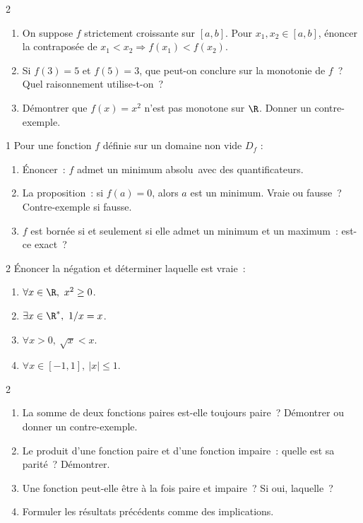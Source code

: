\begin{exo}{2}
\begin{enumerate}
  \item On suppose $f$ strictement croissante sur $[a,b]$.
        Pour $x_1,x_2\in[a,b]$, \'enoncer la contrapos\'ee de
        $x_1<x_2\Rightarrow f(x_1)<f(x_2)$.
  \item Si $f(3)=5$ et $f(5)=3$, que peut-on conclure sur la monotonie de $f$~?
        Quel raisonnement utilise-t-on~?
  \item D\'emontrer que $f(x)=x^2$ n'est pas monotone sur $\R$.
        Donner un contre-exemple.
\end{enumerate}
\end{exo}

\begin{exo}{1}
Pour une fonction $f$ d\'efinie sur un domaine non vide $D_f$ :
\begin{enumerate}
  \item \'Enoncer~: \og $f$ admet un minimum absolu\fg\ avec des quantificateurs.
  \item La proposition~: \og si $f(a)=0$, alors $a$ est un minimum\fg.
        Vraie ou fausse~? Contre-exemple si fausse.
  \item \og $f$ est born\'ee si et seulement si elle admet un minimum
        et un maximum\fg~: est-ce exact~?
\end{enumerate}
\end{exo}

\begin{exo}{2}
\'Enoncer la n\'egation et d\'eterminer laquelle est vraie~:
\begin{enumerate}
  \item $\forall x\in\R,\ x^2\geq0$.
  \item $\exists x\in\R^*,\ 1/x=x$.
  \item $\forall x>0,\ \sqrt{x}<x$.
  \item $\forall x\in[-1,1],\ |x|\leq1$.
\end{enumerate}
\end{exo}

\begin{exo}{2}
\begin{enumerate}
  \item La somme de deux fonctions paires est-elle toujours paire~?
        D\'emontrer ou donner un contre-exemple.
  \item Le produit d'une fonction paire et d'une fonction impaire~:
        quelle est sa parit\'e~? D\'emontrer.
  \item Une fonction peut-elle \^etre \`a la fois paire et impaire~?
        Si oui, laquelle~?
  \item Formuler les r\'esultats pr\'ec\'edents comme des implications.
\end{enumerate}
\end{exo}

